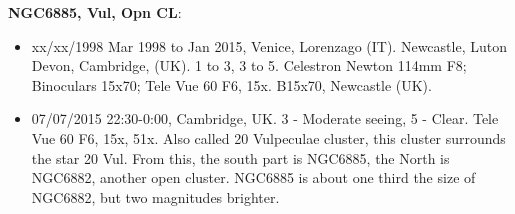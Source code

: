 {\bf NGC6885, Vul, Opn CL}:
\begin{itemize}
\item xx/xx/1998 Mar 1998 to Jan 2015, Venice, Lorenzago (IT). Newcastle, Luton Devon, Cambridge, (UK). 1 to 3, 3 to 5. Celestron Newton 114mm F8; Binoculars 15x70; Tele Vue 60 F6, 15x. B15x70, Newcastle (UK).
\item 07/07/2015 22:30-0:00, Cambridge, UK. 3 - Moderate seeing, 5 - Clear. Tele Vue 60 F6, 15x, 51x. Also called 20 Vulpeculae cluster, this cluster surrounds the star 20 Vul. From this, the south part is NGC6885, the North is NGC6882, another open cluster. NGC6885 is about one third the size of NGC6882, but two magnitudes brighter.
\end{itemize}
